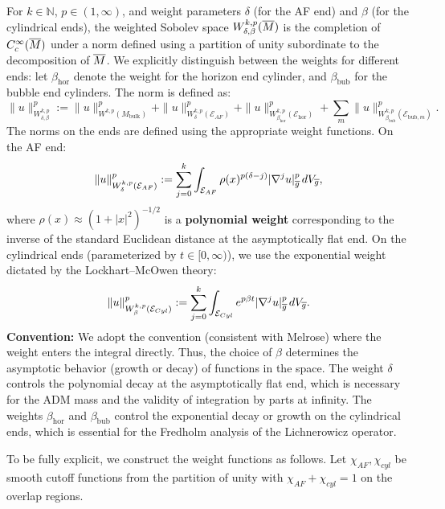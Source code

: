\begin{definition}\label{def:WeightedSpaces}
For $k \in \mathbb{N}$, $p \in (1, \infty)$, and weight parameters $\delta$ (for the AF end) and $\beta$ (for the cylindrical ends), the weighted Sobolev space $W^{k,p}_{\delta, \beta}(\overline{M})$ is the completion of $C^\infty_c(\overline{M})$ under a norm defined using a partition of unity subordinate to the decomposition of $\overline{M}$. We explicitly distinguish between the weights for different ends: let $\beta_{\mathrm{hor}}$ denote the weight for the horizon end cylinder, and $\beta_{\mathrm{bub}}$ for the bubble end cylinders. The norm is defined as:
\[
    \|u\|_{W^{k,p}_{\delta, \beta}}^p := \|u\|_{W^{k,p}(M_{\mathrm{bulk}})}^p + \|u\|_{W^{k,p}_\delta(\mathcal{E}_{AF})}^p + \|u\|_{W^{k,p}_{\beta_{\mathrm{hor}}}(\mathcal{E}_{\mathrm{hor}})}^p + \sum_{m} \|u\|_{W^{k,p}_{\beta_{\mathrm{bub}}}(\mathcal{E}_{\mathrm{bub}, m})}^p.
\]
The norms on the ends are defined using the appropriate weight functions. On the AF end:
\[
    \|u\|_{W^{k,p}_\delta(\mathcal{E}_{AF})}^p := \sum_{j=0}^k \int_{\mathcal{E}_{AF}} \rho(x)^{p(\delta-j)} |\nabla^j u|_{\overline{g}}^p \, dV_{\overline{g}},
\]
where $\rho(x) \approx (1+|x|^2)^{-1/2}$ is a \textbf{polynomial weight} corresponding to the inverse of the standard Euclidean distance at the asymptotically flat end.
On the cylindrical ends (parameterized by $t \in [0, \infty)$), we use the exponential weight dictated by the Lockhart--McOwen theory:
\[ 
    \|u\|_{W^{k,p}_\beta(\mathcal{E}_{Cyl})}^p := \sum_{j=0}^k \int_{\mathcal{E}_{Cyl}} e^{p\beta t} |\nabla^j u|_{\overline{g}}^p \, dV_{\overline{g}}.
\]
\textbf{Convention:} We adopt the convention (consistent with Melrose) where the weight enters the integral directly. Thus, the choice of $\beta$ determines the asymptotic behavior (growth or decay) of functions in the space.
The weight $\delta$ controls the polynomial decay at the asymptotically flat end, which is necessary for the ADM mass and the validity of integration by parts at infinity. The weights $\beta_{\mathrm{hor}}$ and $\beta_{\mathrm{bub}}$ control the exponential decay or growth on the cylindrical ends, which is essential for the Fredholm analysis of the Lichnerowicz operator.

\begin{remark}\label{rem:ExplicitWeightConstruction}
To be fully explicit, we construct the weight functions as follows. Let $\chi_{AF}, \chi_{cyl}$ be smooth cutoff functions from the partition of unity with $\chi_{AF} + \chi_{cyl} = 1$ on the overlap regions.


\end{remark}
\end{definition}

